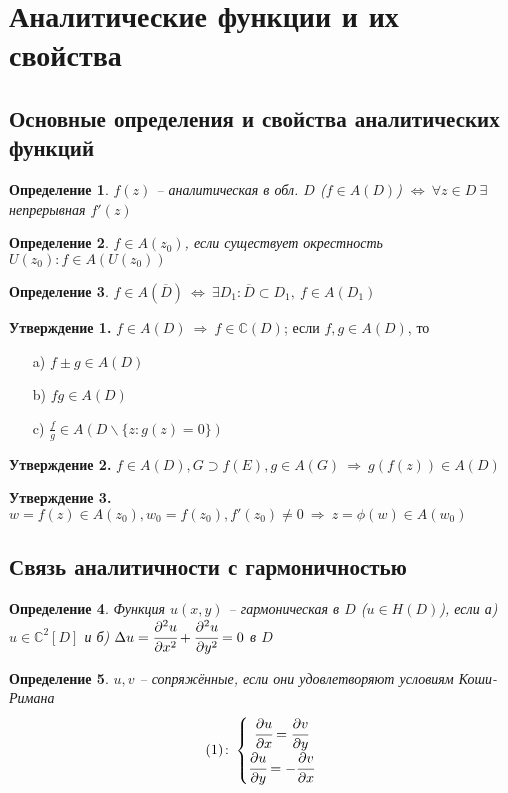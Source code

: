 \documentclass[draft]{article}
\newcommand{\dd}{\partial}
\newcommand{\then}{\ \Rightarrow\ }
\renewcommand{\C}{\mathbb{C}}
\newcommand{\LRA}{\Leftrightarrow}
\renewcommand{\bar}{\overline}
\renewcommand{\f}{\phi}
\newcommand{\D}{\Delta}
\newcommand{\z}{\bar{z}}
\newcommand{\sys}[1]{\left\{\begin{matrix}#1\end{matrix}\right.}
\newcommand{\opr}[1]{\begin{opred}#1\end{opred}}
\newtheorem*{opred}{Определение}
\theoremstyle{remark}
\begin{document}
%
%

\newpage

\section{Аналитические функции и их свойства}

\subsection{Основные определения и свойства аналитических функций}

\opr{$f(z)$ -- аналитическая в обл. $D$ ($f\in A(D)$) $\LRA\ \forall z\in D\ \exists$ непрерывная $f'(z)$ }
\opr{$f\in A(z_0)$, если существует окрестность $U(z_0)\colon f\in A(U(z_0))$}
\opr{$f\in A(\bar{D})\ \LRA\ \exists D_1\colon \bar{D}\subset D_1,\ f\in A(D_1)$}

{\bfseries Утверждение 1.} 
$f\in A(D)\then f\in \C(D)$; 
если $f,g\in A(D)$, то
\begin{itemize}
\item[a)] $f\pm g\in A(D)$
\item[b)] $fg \in A(D)$
\item[c)] $\frac fg \in A(D\smallsetminus\{z\colon g(z)=0\})$
\end{itemize}

{\bfseries Утверждение 2.} 
$f\in A(D), G\supset f(E), g\in A(G)\then g(f(z))\in A(D)$

{\bfseries Утверждение 3.} 
$w=f(z)\in A(z_0), w_0=f(z_0), f'(z_0)\neq 0 \then z=\f(w)\in A(w_0)$

\subsection{Связь аналитичности с гармоничностью}

\opr{Функция $u(x,y)$ -- гармоническая в $D$ ($u\in H(D)$), если а) $u\in\C^2[D]$ и б) $\D u=\cfrac{\dd^2u}{\dd x^2}+\cfrac{\dd^2u}{\dd y^2}=0$ в $D$}

\opr{$u,v$ -- сопряжённые, если они удовлетворяют условиям Коши-Римана $$(1)\colon\sys{\cfrac{\dd u}{\dd x}=\cfrac{\dd v}{\dd y} \\ \cfrac{\dd u}{\dd y}=-\cfrac{\dd v}{\dd x}}$$}
\end{document}
